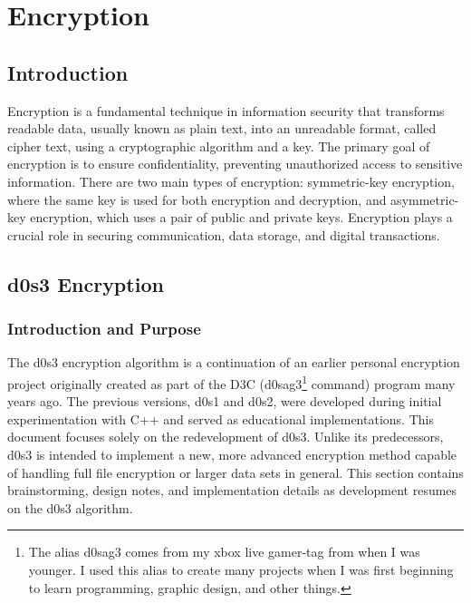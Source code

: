\chapter{Encryption}
\thispagestyle{fancy}
\label{chap:encryption}


\section{Introduction}

Encryption is a fundamental technique in information security that transforms readable data, usually known as plain text, into an unreadable format, called cipher text, using a cryptographic algorithm and a key. The primary goal of encryption is to ensure confidentiality, preventing unauthorized access to sensitive information. There are two main types of encryption: symmetric-key encryption, where the same key is used for both encryption and decryption, and asymmetric-key encryption, which uses a pair of public and private keys. Encryption plays a crucial role in securing communication, data storage, and digital transactions.

















\section{d0s3 Encryption}

\subsection{Introduction and Purpose}

The d0s3 encryption algorithm is a continuation of an earlier personal encryption project originally created as part of the D3C (d0sag3\footnote{The alias d0sag3 comes from my xbox live gamer-tag from when I was younger. I used this alias to create many projects when I was first beginning to learn programming, graphic design, and other things.} command) program many years ago. The previous versions, d0s1 and d0s2, were developed during initial experimentation with C++ and served as educational implementations. This document focuses solely on the redevelopment of d0s3. Unlike its predecessors, d0s3 is intended to implement a new, more advanced encryption method capable of handling full file encryption or larger data sets in general. This section contains brainstorming, design notes, and implementation details as development resumes on the d0s3 algorithm.

